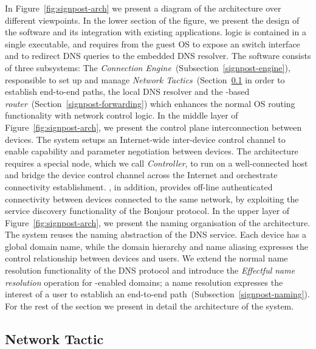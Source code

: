 
In Figure~\ref{fig:signpost-arch} we present
a diagram of the \signpost architecture over different viewpoints. 
In the lower section of the figure, we present the design of the \signpost
software and its integration with existing applications.  \signpost logic is
contained in a single executable, and requires from the guest OS to expose an
\of switch interface and to redirect DNS queries to the embedded DNS resolver.
The software consists of three subsystems: The {\it Connection
  Engine}~(Subsection~\ref{signpost-engine}), responsible to set up and manage
{\it Network Tactics}~(Section~\ref{signpost-tactic} in order to establish
end-to-end paths, the local DNS resolver and the \of-based {\it \signpost
  router}~(Section~\ref{signpost-forwarding}) which enhances the normal OS
routing functionality with \signpost network control logic.  
In the middle layer of Figure~\ref{fig:signpost-arch}, we present the control
plane interconnection between \signpost devices. The system setups an
Internet-wide inter-device control channel to enable capability and parameter
negotiation between devices. The architecture requires a special \signpost node,
which we call \emph{\signpost Controller}, to run on a well-connected host and
bridge the device control channel across the Internet and orchestrate
connectivity establishment. \signpost, in addition, provides off-line
authenticated connectivity between devices connected to the same network, by
exploiting the service discovery functionality of the Bonjour protocol. 
In the upper layer of Figure~\ref{fig:signpost-arch}, we present the naming
organisation of the \signpost architecture. The system reuses the naming
abstraction of the DNS service. Each device has a global domain name, while the
domain hierarchy and name aliasing expresses the control relationship between
devices and users.  We extend the normal name resolution functionality of the
DNS protocol and introduce the  {\it Effectful name resolution} operation for
\signpost-enabled domains; a name resolution expresses the interest of a user to
establish an end-to-end path~(Subsection~\ref{signpost-naming}). For the rest of
the section we present in detail the architecture of the \signpost system. 

\subsection{Network Tactic} \label{signpost-tactic}

